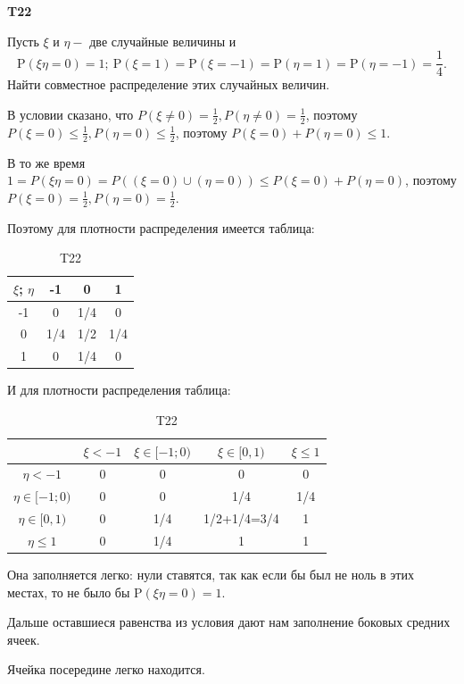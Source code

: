 \documentclass[a4paper,12pt]{article} %
\begin{document}
\begin{example}\textbf{T22}


Пусть $\xi$ и $\eta-$ две случайные величины и 
$$\mathrm{P}(\xi \eta=0)=1; \
\mathrm{P}(\xi=1)=\mathrm{P}(\xi=-1)=\mathrm{P}(\eta=1)=
\mathrm{P}(\eta=-1)=\frac{1}{4}.$$ 
Найти совместное распределение этих случайных величин.

В условии сказано, что $ P(\xi\ne 0)=\frac{1}{2}, P(\eta\ne 0)=\frac{1}{2}$, поэтому 
$ P(\xi = 0) \le \frac{1}{2}, P(\eta = 0) \le \frac{1}{2}$, поэтому $P(\xi = 0) + P(\eta = 0) \le 1$.


В то же время $ 1= P(\xi \eta =0) = P((\xi=0)\cup (\eta=0))\le P(\xi = 0) + P(\eta = 0)$, 
поэтому $ P(\xi = 0)=\frac{1}{2}, P(\eta = 0)=\frac{1}{2}$.

Поэтому для плотности распределения имеется таблица:
\begin{table}[H]
\centering
\begin{tabular}{|c|c|c|c|}
\hline
$ \xi$\textdownarrow; $\eta  $ \textrightarrow	&-1  & 0 & 1   \\ \hline
-1	& 0 & 1/4 & 0   \\ \hline
0   & 1/4 & 1/2 & 1/4 \\ \hline
1	& 0  & 1/4 & 0  \\ \hline
\end{tabular}
\caption{T22}
\end{table}

И для плотности распределения таблица:
\begin{table}[h!]
\centering
\begin{tabular}{|c|c|c|c|c|}
\hline
& $\xi<-1$ & $\xi\in[-1;0)$ & $\xi\in [0,1)$ & $\xi\le 1$ \\ \hline
$\eta <-1$       & 0        & 0              & 0              & 0          \\ \hline
$\eta \in[-1;0)$ & 0        & 0              & 1/4            & 1/4        \\ \hline
$\eta \in [0,1)$ & 0        & 1/4            & 1/2+1/4=3/4    & 1          \\ \hline
$\eta \le 1$     & 0        & 1/4            & 1              & 1          \\ \hline
\end{tabular}
\caption{T22}
\end{table}

Она заполняется легко: нули ставятся, так как если бы был не ноль в этих местах, то не было бы $ \mathrm{P}(\xi \eta=0)=1$.

Дальше оставшиеся равенства из условия дают нам заполнение боковых средних ячеек.

Ячейка посередине легко находится.

\end{example}
\end{document}
